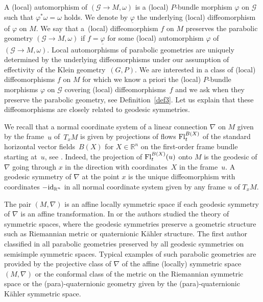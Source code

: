 \documentclass[10pt,a4paper]{amsart}
\newcommand{\om}{\omega}
\newcommand{\un}{\underline}
\newcommand{\ba}{\mathcal{G}}
\newcommand{\va}{\varphi}
\newcommand{\Fl}{{\rm Fl}}
\newcommand{\id}{{\rm id}}
\numberwithin{equation}{section}
\begin{document}
A (local) automorphism of $(\ba\to M,\om)$ is a (local) $P$-bundle morphism $\va$ on $\ba$ such that $\va^*\om=\om$ holds. We denote by $\un{\va}$ the underlying (local) dif\/feomorphism of $\va$ on $M$. We say that a~(local) dif\/feomorphism $f$ on $M$ preserves the parabolic geometry $(\ba\to M,\om)$ if $f=\un{\va}$ for some (local) automorphism $\va$ of $(\ba\to M,\om)$. Local automorphisms of parabolic geometries are uniquely determined by the underlying dif\/feomorphisms under our assumption of ef\/fectivity of the Klein geometry~$(G,P)$. We are interested in a class of (local) dif\/feomorphisms $f$ on $M$ for which we know a priori the (local) $P$-bundle morphisms $\va$ on $\ba$ covering (local) dif\/feomor\-phisms~$f$ and we ask when they preserve the parabolic geometry, see Def\/inition~\ref{def3}. Let us explain that these dif\/feomorphisms are closely related to geodesic symmetries.

We recall that a normal coordinate system of a linear connection $\nabla$ on $M$ given by the frame~$u$ of~$T_xM$ is given by projections of f\/lows $\Fl_t^{B(X)}$ of the standard horizontal vector f\/ields~$B(X)$ for $X\in \mathbb{R}^n$ on the f\/irst-order frame bundle starting at~$u$, see \cite[Section~III.8]{KoNo}. Indeed, the projection of $\Fl_t^{B(X)}(u)$ onto $M$ is the geodesic of $\nabla$ going through $x$ in the direction with coordina\-tes~$X$ in the frame~$u$. A geodesic symmetry of $\nabla$ at the point $x$ is the unique dif\/feomorphism with coordinates $-\id_{\mathbb{R}^n}$ in all normal coordinate system given by any frame $u$ of $T_xM$.

The pair $(M,\nabla)$ is an af\/f\/ine locally symmetric space if each geodesic symmetry of $\nabla$ is an af\/f\/ine transformation.
In \cite{Helgason} or \cite{Besse} the authors studied the theory of symmetric spaces, where the geodesic symmetries preserve a geometric structure such as Riemannian metric or quaternionic K\"ahler structure. The f\/irst author classif\/ied in \cite{G3} all parabolic geometries preserved by all geodesic symmetries on semisimple symmetric spaces. Typical examples of such parabolic geometries are provided by the projective class of $\nabla$ of the af\/f\/ine (locally) symmetric space $(M,\nabla)$ or the conformal class of the metric on the Riemannian symmetric space or the (para)-quaternionic geometry given by the (para)-quaternionic K\"ahler symmetric space.
\end{document}
